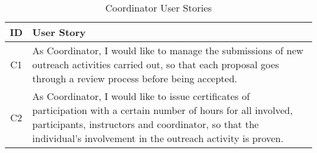 \begin{table}[!htb]
  \centering
  \setlength{\aboverulesep}{0pt}
  \setlength{\belowrulesep}{0pt}
  \caption{Coordinator User Stories}
  \label{tab:coordinator-user-stories}
  \footnotesize
  \begin{tabularx}{\textwidth}{c|X}
    \toprule
    \rowcolor[rgb]{0.753,0.753,0.753} \textbf{ID} & \textbf{User Story}         \\
    \hline
    \rowcolor[rgb]{0.898,0.898,0.898} C1          & As Coordinator, I would like to manage the submissions of new outreach activities carried out, so that each proposal goes through a review process before being accepted.                                           \\
    C2                                            & As Coordinator, I would like to issue certificates of participation with a certain number of hours for all involved, participants, instructors and coordinator, so that the individual's involvement in the outreach activity is proven.                                     \\
    \bottomrule
  \end{tabularx}
\end{table}